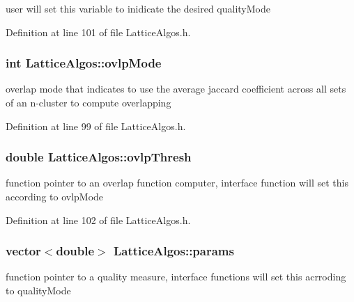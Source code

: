 user will set this variable to inidicate the desired qualityMode 



Definition at line 101 of file LatticeAlgos.h.

\hypertarget{class_lattice_algos_a7a9a7568a564e929c494c7c94ed5dda5}{
\subsubsection[{ovlpMode}]{\setlength{\rightskip}{0pt plus 5cm}int {\bf LatticeAlgos::ovlpMode}}}
\label{class_lattice_algos_a7a9a7568a564e929c494c7c94ed5dda5}


overlap mode that indicates to use the average jaccard coefficient across all sets of an n-\/cluster to compute overlapping 



Definition at line 99 of file LatticeAlgos.h.

\hypertarget{class_lattice_algos_ae50e2eab1478e1bced92b0f1f1bcdc09}{
\subsubsection[{ovlpThresh}]{\setlength{\rightskip}{0pt plus 5cm}double {\bf LatticeAlgos::ovlpThresh}}}
\label{class_lattice_algos_ae50e2eab1478e1bced92b0f1f1bcdc09}


function pointer to an overlap function computer, interface function will set this according to ovlpMode 



Definition at line 102 of file LatticeAlgos.h.

\hypertarget{class_lattice_algos_a84a7c48411084ff5d792af41e57ce96a}{
\subsubsection[{params}]{\setlength{\rightskip}{0pt plus 5cm}vector$<$double$>$ {\bf LatticeAlgos::params}}}
\label{class_lattice_algos_a84a7c48411084ff5d792af41e57ce96a}


function pointer to a quality measure, interface functions will set this acrroding to qualityMode 



